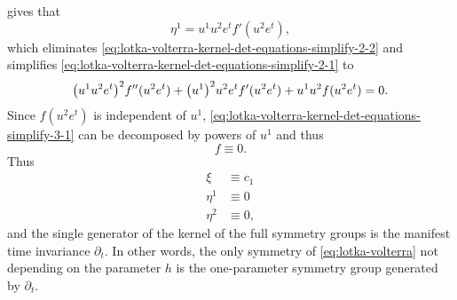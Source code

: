  gives that
\begin{equation}
  \eta^1 = u^1 u^2 e^t f'(u^2 e^t),
\end{equation}
which eliminates \cref{eq:lotka-volterra-kernel-det-equations-simplify-2-2} and simplifies \cref{eq:lotka-volterra-kernel-det-equations-simplify-2-1} to
\begin{equation}\label{eq:lotka-volterra-kernel-det-equations-simplify-3-1}
  \qty(u^1 u^2 e^t)^2 f''(u^2 e^t) + \qty(u^1)^2 u^2 e^t f'(u^2 e^t) + u^1 u^2 f(u^2 e^t) = 0.
\end{equation}
Since \(f(u^2 e^t)\) is independent of \(u^1\), \cref{eq:lotka-volterra-kernel-det-equations-simplify-3-1} can be decomposed by powers of \(u^1\) and thus
\begin{equation}
  f \equiv 0.
\end{equation}
Thus
\begin{align}
  \xi &\equiv c_1\\
  \eta^1 &\equiv 0\\
  \eta^2 &\equiv 0,
\end{align}
and the single generator of the kernel of the full symmetry groups is the manifest time invariance \(\partial_t\).
In other words, the only symmetry of \cref{eq:lotka-volterra} not depending on the parameter \(h\) is the one-parameter symmetry group generated by \(\partial_t\).
